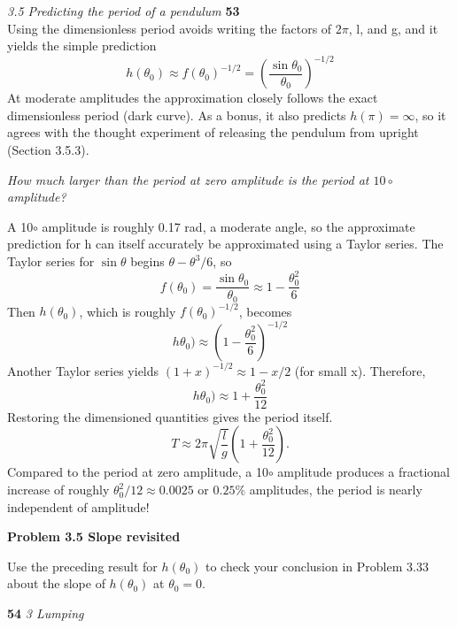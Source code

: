 \documentclass[a4paper, 11pt]{book}
\begin{document}
    \noindent
    \large\textit{3.5 Predicting the period of a pendulum} \hfill \textbf{53} \\

    Using the dimensionless period avoids writing the factors of $2\pi$, l, and g, and it yields the simple prediction
    \begin{equation}h(\theta_{0})\approx f(\theta_{0})^{{-1}/{2}}=\left( \frac{\sin\theta_{0}}{\theta_{0}} \right)^{{-1}/{2}}\end{equation}
    At moderate amplitudes the approximation closely
    follows the exact dimensionless period (dark curve). As a bonus, it also
    predicts $h({\pi}) ={\infty}$, so it agrees with the thought experiment of releasing
    the pendulum from upright (Section 3.5.3).

    \textit{How much larger than the period at zero amplitude is the period at $10\circ$ amplitude?}

    A 10$\circ$ amplitude is roughly 0.17 rad, a moderate angle, so the approximate
    prediction for h can itself accurately be approximated using a Taylor series.
    The Taylor series for $\sin\theta$ begins ${\theta}-{\theta^3/6}$, so
    \begin{equation}f(\theta_{0})=\frac{\sin\theta_{0}}{\theta_{0}}\approx 1-\frac{\theta_{0}^2}{6}\end{equation}
    Then $h(\theta_{0})$, which is roughly $f(\theta_{0})^{{-1}/{2}}$, becomes
    \begin{equation}h\theta_{0})\approx \left(1-\frac{\theta_{0}^2}{6} \right)^{{-1}/{2}}\end{equation}
    Another Taylor series yields $(1+x)^{{-1}/{2}}\approx 1 − x/2$ (for small x). Therefore,
    \begin{equation}h\theta_{0})\approx 1+\frac{\theta_{0}^2}{12}\end{equation}
    Restoring the dimensioned quantities gives the period itself.
    \begin{equation}T\approx 2\pi\sqrt{\frac{l}{g}}\left(1+\frac{\theta_{0}^2}{12}\right).\end{equation}
    Compared to the period at zero amplitude, a 10$\circ$ amplitude produces a
    fractional increase of roughly $\theta_{0}^2/12 \approx 0.0025$ or $0.25\%$
    amplitudes, the period is nearly independent of amplitude!

    \colorbox{light-gray}{
    \begin{minipage}{\textwidth}
    \textbf {Problem 3.5 Slope revisited}

    Use the preceding result for $h(\theta_{0})$ to check your conclusion in Problem 3.33
    about the slope of $h(\theta_{0})$ at $\theta_{0}= 0$.
    \end{minipage}
    }
    \newpage
    \noindent
    \large\textbf{54} \hfill \textit{3 Lumping} \\
\end{document}
